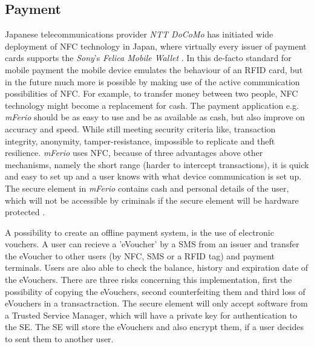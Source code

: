 \subsection{Payment}
Japanese telecommunications provider \textit{NTT DoCoMo} has initiated wide deployment of NFC technology in Japan, where virtually every issuer of payment cards supports the \textit{Sony}'s \textit{Felica Mobile Wallet} \cite{yamauchi2006intensive}.
In this de-facto standard for mobile payment the mobile device emulates the behaviour of an RFID card, but in the future much more is possible by making use of the active communication possibilities of NFC. For example, to transfer money between two people, NFC technology might become a replacement for cash. The payment application e.g. \textit{mFerio} should be as easy to use and be as available as cash, but also improve on accuracy and speed. While still meeting security criteria like, transaction integrity, anonymity, tamper-resistance, impossible to replicate and theft resilience. 
\textit{mFerio} uses NFC, because of three advantages above other mechanisms, namely the short range (harder to intercept transactions), it is quick and easy to set up and a user knows with what device communication is set up. The secure element in \textit{mFerio} contains cash and personal details of the user, which will not be accessible by criminals if the secure element will be hardware protected \cite{1555846}.

A possibility to create an offline payment system, is the use of electronic vouchers. A user can recieve a 'eVoucher' by a SMS from an issuer and transfer the eVoucher to other users (by NFC, SMS or a RFID tag) and payment terminals. Users are also able to check the balance, history and expiration date of the eVouchers. 
There are three risks concerning this implementation, first the possibility of copying the eVouchers, second counterfeiting them and third loss of eVouchers in a transactraction. The secure element will only accept software from a Trusted Service Manager, which will have a private key for authentication to the SE. The SE will store the eVouchers and also encrypt them, if a user decides to sent them to another user. \cite{1592613}


